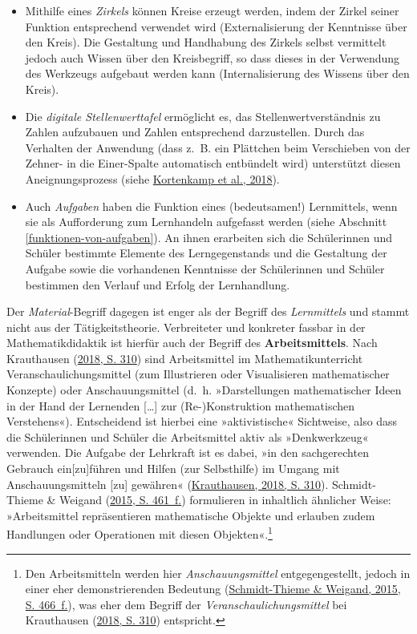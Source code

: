 \documentclass[
]{scrbook}
\providecommand{\tightlist}{%
  \setlength{\itemsep}{0pt}\setlength{\parskip}{0pt}}
\theoremstyle{definition}
\theoremstyle{definition}
\theoremstyle{definition}
\theoremstyle{definition}
\theoremstyle{remark}
\begin{document}
\begin{itemize}
\tightlist
\item
  Mithilfe eines \emph{Zirkels} können Kreise erzeugt werden, indem der Zirkel seiner Funktion entsprechend verwendet wird (Externalisierung der Kenntnisse über den Kreis). Die Gestaltung und Handhabung des Zirkels selbst vermittelt jedoch auch Wissen über den Kreisbegriff, so dass dieses in der Verwendung des Werkzeugs aufgebaut werden kann (Internalisierung des Wissens über den Kreis).
\item
  Die \emph{digitale Stellenwerttafel} ermöglicht es, das Stellenwertverständnis zu Zahlen aufzubauen und Zahlen entsprechend darzustellen. Durch das Verhalten der Anwendung (dass z.~B. ein Plättchen beim Verschieben von der Zehner- in die Einer-Spalte automatisch entbündelt wird) unterstützt diesen Aneignungsprozess (siehe \protect\hyperlink{ref-Kortenkamp2018a}{Kortenkamp et al., 2018}).
\item
  Auch \emph{Aufgaben} haben die Funktion eines (bedeutsamen!) Lernmittels, wenn sie als Aufforderung zum Lernhandeln aufgefasst werden (siehe Abschnitt \ref{funktionen-von-aufgaben}). An ihnen erarbeiten sich die Schülerinnen und Schüler bestimmte Elemente des Lerngegenstands und die Gestaltung der Aufgabe sowie die vorhandenen Kenntnisse der Schülerinnen und Schüler bestimmen den Verlauf und Erfolg der Lernhandlung.
\end{itemize}

Der \emph{Material}-Begriff dagegen ist enger als der Begriff des \emph{Lernmittels} und stammt nicht aus der Tätigkeitstheorie. Verbreiteter und konkreter fassbar in der Mathematikdidaktik ist hierfür auch der Begriff des \textbf{Arbeitsmittels}. Nach Krauthausen (\protect\hyperlink{ref-Krauthausen:2018}{2018, S. 310}) sind Arbeitsmittel im Mathematikunterricht Veranschaulichungsmittel (zum Illustrieren oder Visualisieren mathematischer Konzepte) oder Anschauungsmittel (d.~h. »Darstellungen mathematischer Ideen in der Hand der Lernenden {[}\ldots{]} zur (Re-)Konstruktion mathematischen Verstehens«). Entscheidend ist hierbei eine »aktivistische« Sichtweise, also dass die Schülerinnen und Schüler die Arbeitsmittel aktiv als »Denkwerkzeug« verwenden. Die Aufgabe der Lehrkraft ist es dabei, »in den sachgerechten Gebrauch ein{[}zu{]}führen und Hilfen (zur Selbsthilfe) im Umgang mit Anschauungsmitteln {[}zu{]} gewähren« (\protect\hyperlink{ref-Krauthausen:2018}{Krauthausen, 2018, S. 310}). Schmidt-Thieme \& Weigand (\protect\hyperlink{ref-Schmidt-Thieme2015}{2015, S. 461~f.}) formulieren in inhaltlich ähnlicher Weise: »Arbeitsmittel repräsentieren mathematische Objekte und erlauben zudem Handlungen oder Operationen mit diesen Objekten«.\footnote{Den Arbeitsmitteln werden hier \emph{Anschauungsmittel} entgegengestellt, jedoch in einer eher demonstrierenden Bedeutung (\protect\hyperlink{ref-Schmidt-Thieme2015}{Schmidt-Thieme \& Weigand, 2015, S. 466~f.}), was eher dem Begriff der \emph{Veranschaulichungsmittel} bei Krauthausen (\protect\hyperlink{ref-Krauthausen:2018}{2018, S. 310}) entspricht.}
\end{document}
